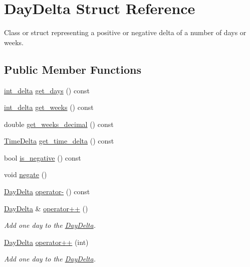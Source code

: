 \hypertarget{structDayDelta}{\section{\-Day\-Delta \-Struct \-Reference}
\label{structDayDelta}
}


\-Class or struct representing a positive or negative delta of a number of days or weeks.  


\subsection*{\-Public \-Member \-Functions}
\begin{DoxyCompactItemize}
\item 
\hyperlink{types_8h_a10729255b1946fd4fb654b2fe814910b}{int\-\_\-delta} \hyperlink{structDayDelta_a59159b1d56a28b5f2a693979e4b280a1}{get\-\_\-days} () const 
\item 
\hyperlink{types_8h_a10729255b1946fd4fb654b2fe814910b}{int\-\_\-delta} \hyperlink{structDayDelta_a2f4510044f51ebb61ffef942ee173de2}{get\-\_\-weeks} () const 
\item 
double \hyperlink{structDayDelta_a2e3251e65463940ef87d447d51948e05}{get\-\_\-weeks\-\_\-decimal} () const 
\item 
\hyperlink{structTimeDelta}{\-Time\-Delta} \hyperlink{structDayDelta_ab10777d5c043236aa613081d56317642}{get\-\_\-time\-\_\-delta} () const 
\item 
bool \hyperlink{structDayDelta_a10d6b9eac43322a957f7c3dfbedc2862}{is\-\_\-negative} () const 
\item 
void \hyperlink{structDayDelta_a23b9453556a255f5413aee21b12938a6}{negate} ()
\item 
\hyperlink{structDayDelta}{\-Day\-Delta} \hyperlink{structDayDelta_ab147a13f61362001a4acdaa1b782d1cf}{operator-\/} () const 
\item 
\hyperlink{structDayDelta}{\-Day\-Delta} \& \hyperlink{structDayDelta_aa0a78ca9d3a6a3241211e22d638e0323}{operator++} ()
\begin{DoxyCompactList}\small\item\em \-Add one day to the \hyperlink{structDayDelta}{\-Day\-Delta}. \end{DoxyCompactList}\item 
\hyperlink{structDayDelta}{\-Day\-Delta} \hyperlink{structDayDelta_a6f5ca65ca16018cdf39bd5543cbec127}{operator++} (int)
\begin{DoxyCompactList}\small\item\em \-Add one day to the \hyperlink{structDayDelta}{\-Day\-Delta}. \end{DoxyCompactList}\item 

\end{DoxyCompactItemize}
